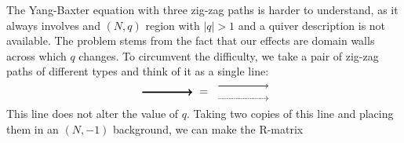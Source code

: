 The Yang-Baxter equation with three zig-zag paths is harder to understand,
as it always involves and $\left( N,q \right)$ region with $\left| q \right|>1$
and a quiver description is not available. The problem stems from
the fact that our effects are domain walls across which $q$ changes.
To circumvent the difficulty, we take a pair of zig-zag paths of different
types and think of it as a single line:
\begin{equation}
    \begin{tikzpicture}[scale=1, baseline=(x.base)]    \node (x) at (0,0) {\vphantom{x}};

        \draw[very thick, ->] (0,0) -- (1.6,0);

    \end{tikzpicture}
  \ = \
    \begin{tikzpicture}[scale=1, baseline=(x.base)]    \node (x) at (0,0) {\vphantom{x}};

        \draw[semithick, ->, yshift=0.2cm] (0,0) -- (1.6,0);
        \draw[semithick, densely dotted, ->, yshift=-0.2cm] (0,0) -- (1.6,0);

    \end{tikzpicture}
\end{equation}
 This line does not alter the value of $q$. Taking two copies of
this line and placing them in an $\left( N,-1 \right)$ background,
we can make the R-matrix
